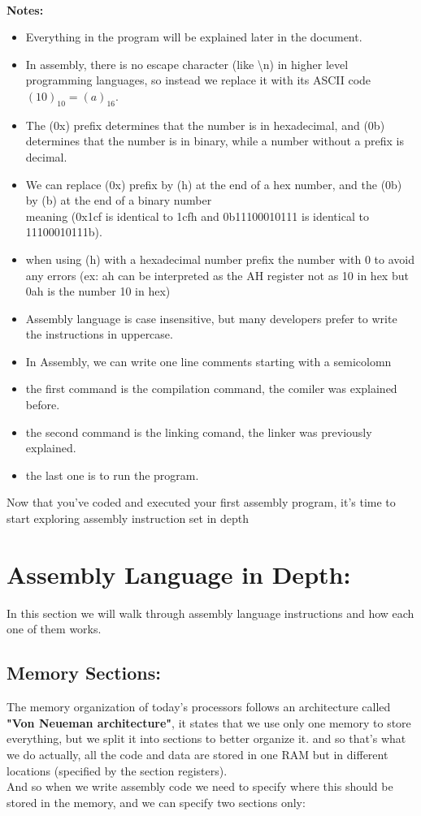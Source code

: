 \documentclass[10pt]{article}
\begin{document}
    \\\textbf{Notes: }\begin{itemize}
        \item Everything in the program will be explained later in the document.
        \item In assembly, there is no escape character (like \textbackslash n) in higher level programming languages, so instead we replace it with its ASCII code $(10)_{10} = (a)_{16}$.
        \item The (0x) prefix determines that the number is in hexadecimal, and (0b) determines that the number is in binary, while a number without a prefix is decimal.
        \item We can replace (0x) prefix by (h) at the end of a hex number, and the (0b) by (b) at the end of a binary number\\
        meaning (0x1cf is identical to 1cfh and 0b11100010111 is identical to 11100010111b).
        \item when using (h) with a hexadecimal number prefix the number with 0 to avoid any errors (ex: ah can be interpreted as the AH register not as 10 in hex but 0ah is the number 10 in hex)
        \item Assembly language is case insensitive, but many developers prefer to write the instructions in uppercase.
        \item In Assembly, we can write one line comments starting with a semicolomn
        \item the first command is the compilation command, the comiler was explained before.
        \item the second command is the linking comand, the linker was previously explained.
        \item the last one is to run the program.
    \end{itemize}
    \tabto{20pt}Now that you've coded and executed your first assembly program, it's time to start exploring assembly instruction set in depth
    \newpage
    \section{Assembly Language in Depth: }
    In this section we will walk through assembly language instructions and how each one of them works.
    \subsection{Memory Sections: }
    The memory organization of today's processors follows an architecture called \textbf{"Von Neueman architecture"}, it states that we use only one memory to store everything, but we split it into sections to better organize it.
    and so that's what we do actually, all the code and data are stored in one RAM but in different locations (specified by the section registers).\\
    \tabto{20pt}And so when we write assembly code we need to specify where this should be stored in the memory, and we can specify two sections only:
\end{document}
